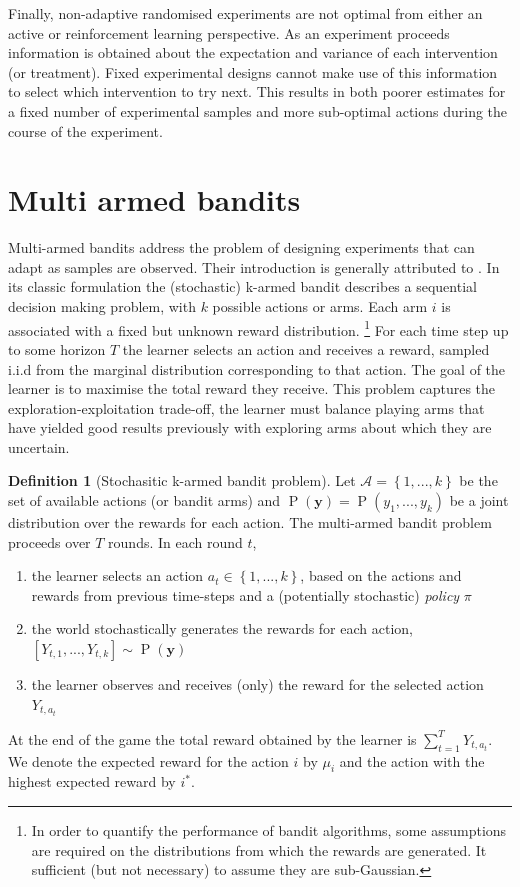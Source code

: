 \documentclass[11pt,a4paper,oneside]{book}
\newcommand{\actionspace}{\mathcal{A}}
\newcommand{\set}[1]{\left\{#1\right\}}
\renewcommand{\P}[1]{\operatorname{P}\left(#1\right)}
\renewcommand{\vec}[1]{\boldsymbol{#1}}
\theoremstyle{plain}
\theoremstyle{definition}
\newtheorem{definition}[theorem]{Definition}
\begin{document}
Finally, non-adaptive randomised experiments are not optimal from either an active or reinforcement learning perspective. As an experiment proceeds information is obtained about the expectation and variance of each intervention (or treatment). Fixed experimental designs cannot make use of this information to select which intervention to try next. This results in both poorer estimates for a fixed number of experimental samples and more sub-optimal actions during the course of the experiment.

\section{Multi armed bandits}
\label{sec:multi-armed-bandits}

Multi-armed bandits address the problem of designing experiments that can adapt as samples are observed. Their introduction is generally attributed to \citet{Thompson1993}. In its classic formulation \citep{Robbins1952,Lai1985} the (stochastic) k-armed bandit describes a sequential decision making problem, with $k$ possible actions or arms. Each arm $i$ is associated with a fixed but unknown reward distribution. \footnote{In order to quantify the performance of bandit algorithms, some assumptions are required on the distributions from which the rewards are generated. It sufficient (but not necessary) to assume they are sub-Gaussian.} For each time step up to some horizon $T$ the learner selects an action and receives a reward, sampled i.i.d from the marginal distribution corresponding to that action. The goal of the learner is to maximise the total reward they receive. This problem captures the exploration-exploitation trade-off, the learner must balance playing arms that have yielded good results previously with exploring arms about which they are uncertain.

\vspace{0.5cm}
\begin{definition}[Stochasitic k-armed bandit problem]
Let $\actionspace = \set{1,...,k}$ be the set of available actions (or bandit arms) and $\P{\vec{y}} = \P{y_1,...,y_k}$ be a joint distribution over the rewards for each action. The multi-armed bandit problem proceeds over $T$ rounds. In each round $t$, 
\begin{enumerate}
\item the learner selects an action $a_{t} \in \set{1,...,k}$, based on the actions and rewards from previous time-steps and a (potentially stochastic) \emph{policy} $\pi$
\item the world stochastically generates the rewards for each action, $[Y_{t,1},...,Y_{t,k}] \sim \P{\vec{y}}$
\item the learner observes and receives (only) the reward for the selected action $Y_{t,a_t}$ 
\end{enumerate}
At the end of the game the total reward obtained by the learner is $\sum_{t=1}^T Y_{t,a_t}$. We denote the expected reward for the action $i$ by $\mu_i$ and the action with the highest expected reward by $i^*$. 
\end{definition} 
\end{document}
